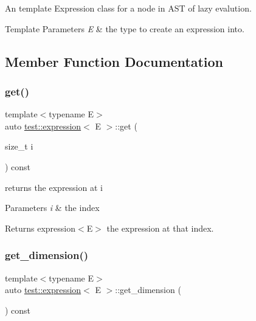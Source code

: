 An template Expression class for a node in A\+ST of lazy evalution. 


\begin{DoxyTemplParams}{Template Parameters}
{\em E} & the type to create an expression into. \\
\hline
\end{DoxyTemplParams}


\subsection{Member Function Documentation}
\mbox{\label{classtest_1_1expression_a8752a4a375aa68ee321d2312bc92f0c2}} 
\subsubsection{\texorpdfstring{get()}{get()}}
{\footnotesize\ttfamily template$<$typename E$>$ \\
auto \mbox{\hyperlink{classtest_1_1expression}{test\+::expression}}$<$ E $>$\+::get (\begin{DoxyParamCaption}\item[{size\+\_\+t}]{i }\end{DoxyParamCaption}) const\hspace{0.3cm}{\ttfamily [inline]}}



returns the expression at i 


\begin{DoxyParams}{Parameters}
{\em i} & the index \\
\hline
\end{DoxyParams}
\begin{DoxyReturn}{Returns}
expression$<$\+E$>$ the expression at that index. 
\end{DoxyReturn}
\mbox{\label{classtest_1_1expression_aa9a3a5989c12512ff9d1703098c22eb5}} 
\subsubsection{\texorpdfstring{get\_dimension()}{get\_dimension()}}
{\footnotesize\ttfamily template$<$typename E$>$ \\
auto \mbox{\hyperlink{classtest_1_1expression}{test\+::expression}}$<$ E $>$\+::get\+\_\+dimension (\begin{DoxyParamCaption}{ }\end{DoxyParamCaption}) const\hspace{0.3cm}{\ttfamily [inline]}}



